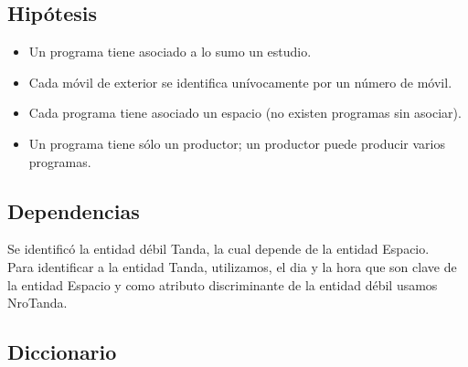 \documentclass[a4paper,10pt,titlepage]{article}
\begin{document}
\pagebreak

\subsection{Hip\'otesis}
\begin{itemize}
\item Un programa tiene asociado a lo sumo un estudio.
\item Cada m\'ovil de exterior se identifica un\'ivocamente por un n\'umero de m\'ovil.
\item Cada programa tiene asociado un espacio (no existen programas sin asociar).
\item Un programa tiene s\'olo un productor; un productor puede producir varios programas.
\end{itemize}

\subsection{Dependencias}

Se identific\'o la entidad d\'ebil Tanda, la cual depende de la entidad Espacio.\\
Para identificar a la entidad Tanda, utilizamos, el dia y la hora que son clave de la entidad Espacio y como atributo discriminante de la entidad d\'ebil usamos NroTanda.

\pagebreak

\subsection{Diccionario}
\end{document}
